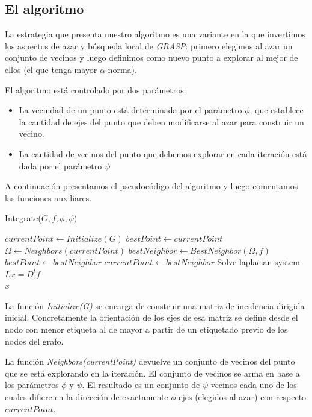 \documentclass[conference,compsoc,a4paper]{IEEEtran}
\begin{document}
\subsection{El algoritmo}

La estrategia que presenta nuestro algoritmo es una variante en la que 
invertimos los aspectos de azar y búsqueda local de \textit{GRASP}: 
primero elegimos al azar un conjunto de vecinos y luego definimos como 
nuevo punto a explorar al mejor de ellos (el que tenga mayor 
$\alpha$-norma). 

\smallskip

El algoritmo está controlado por dos parámetros:

\begin{itemize}
	\item La vecindad de un punto está determinada por el parámetro 
	$\phi$, que establece la cantidad de ejes del punto que deben 
	modificarse al azar para construir un vecino.
	\item La cantidad de vecinos del punto que debemos explorar en cada 
	iteración está dada por el parámetro $\psi$
\end{itemize}

A continuación presentamos el pseudocódigo del algoritmo y luego 
comentamos las funciones auxiliares.

\begin{algorithm}
    \caption{Integrate($G,f,\phi,\psi$)}
	\begin{algorithmic}
		\State $currentPoint \gets Initialize(G)$
		\State $bestPoint \gets currentPoint$
			\State $\Omega \gets Neighbors(currentPoint)$
			\State $bestNeighbor \gets BestNeighbor(\Omega,f)$
				\State $bestPoint \gets bestNeighbor$
			\EndIf
			\State $currentPoint \gets bestNeighbor$
		\EndWhile
		\State Solve laplacian system $L x = D^t f$ \\
		\Return $x$
	\end{algorithmic}
	\label{alg:alg1}
\end{algorithm}

La función \emph{Initialize(G)} se encarga de construir 
una matriz de incidencia dirigida inicial. Concretamente la orientación 
de los ejes de esa matriz se define desde el nodo con menor 
etiqueta al de mayor a partir de un etiquetado previo de los nodos del 
grafo. 

\smallskip

La función \emph{Neighbors(currentPoint)} devuelve un conjunto de 
vecinos del punto que se está explorando en la iteración. El conjunto 
de vecinos se arma en base a los parámetros $\phi$ y $\psi$. El 
resultado es un conjunto de $\psi$ vecinos cada uno de los cuales 
difiere en la dirección de exactamente $\phi$ ejes (elegidos al azar) 
con respecto $currentPoint$.
\end{document}
